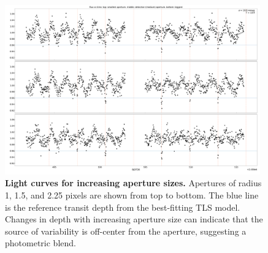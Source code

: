 \documentclass[12pt,twocolumn,tighten]{aastex62}
\begin{document}
\begin{figure}[!h]
	\begin{center}
		\leavevmode
		\includegraphics[width=0.98\textwidth]{gaiatwo0005599752663752776192-0007_page04.pdf}
	\end{center}
	\vspace{-0.5cm}
	\caption{
		{\bf Light curves for increasing aperture sizes.} 
    Apertures of radius 1, 1.5, and 2.25 pixels are shown from top to
    bottom.  The blue line is the reference transit depth from the
    best-fitting TLS model.  Changes in depth with increasing aperture size
    can indicate that the source of variability is off-center from the 
    aperture, suggesting a photometric blend.
		\label{fig:pg4}
	}
\end{figure}
\end{document}

